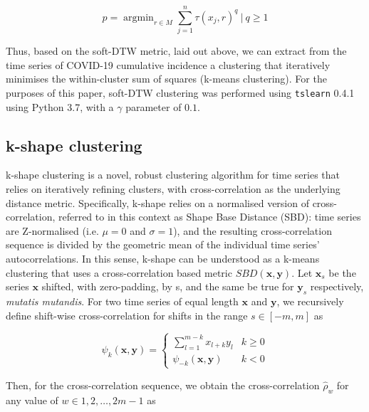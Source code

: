 \documentclass{article}
\begin{document}
\begin{equation}
	p = \mathop{arg min}_{r \in M} \sum_{j = 1}^n \tau(x_j, r)^q \ | \ q \geq 1
\end{equation}

Thus, based on the soft-DTW metric, laid out above, we can extract from the time series of COVID-19 cumulative incidence a clustering that iteratively minimises the within-cluster sum of squares (k-means clustering). For the purposes of this paper, soft-DTW clustering was performed using \texttt{tslearn} 0.4.1\cite{JMLR:v21:20-091} using Python 3.7, with a $\gamma$ parameter of $0.1$.


\subsection{k-shape clustering} %
\label{sub:k_shape_clustering}

k-shape clustering is a novel, robust clustering algorithm for time series that relies on iteratively refining clusters, with cross-correlation as the underlying distance metric.\cite{paparrizos2015k} Specifically, k-shape relies on a normalised version of cross-correlation, referred to in this context as Shape Base Distance (SBD): time series are Z-normalised (i.e. $\mu = 0$ and $\sigma = 1$), and the resulting cross-correlation sequence is divided by the geometric mean of the individual time series' autocorrelations. In this sense, k-shape can be understood as a k-means clustering that uses a cross-correlation based metric $SBD(\mathbf{x}, \mathbf{y})$. Let $\mathbf{x}_s$ be the series $\mathbf{x}$ shifted, with zero-padding, by s, and the same be true for $\mathbf{y}_s$ respectively, \emph{mutatis mutandis}. For two time series of equal length $\mathbf{x}$ and $\mathbf{y}$, we recursively define shift-wise cross-correlation for shifts in the range $s \in [-m, m]$ as

\begin{equation}
	\psi_{k} (\mathbf{x}, \mathbf{y}) = 
	\begin{cases}
		\displaystyle \sum_{l = 1}^{m - k} x_{l + k} y_l 		& k \geq 0 \\
		\psi_{-k} (\mathbf{x}, \mathbf{y})						& k < 0 
	\end{cases}
\end{equation}

Then, for the cross-correlation sequence, we obtain the cross-correlation $\hat{\rho}_w$ for any value of $w \in {1, 2, \ldots, 2m - 1}$ as
\end{document}
